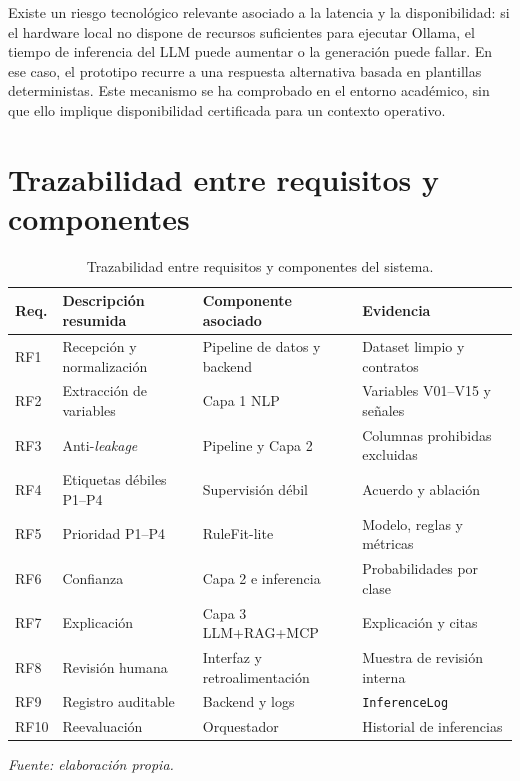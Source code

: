 Existe un riesgo tecnológico relevante asociado a la latencia y la disponibilidad: si el hardware local no dispone de recursos suficientes para ejecutar Ollama, el tiempo de inferencia del LLM puede aumentar o la generación puede fallar. En ese caso, el prototipo recurre a una respuesta alternativa basada en plantillas deterministas. Este mecanismo se ha comprobado en el entorno académico, sin que ello implique disponibilidad certificada para un contexto operativo.

\section{Trazabilidad entre requisitos y componentes}

\begin{table}[htbp]
\centering
\scriptsize
\setlength{\tabcolsep}{4pt}
\begin{tabularx}{\textwidth}{|p{1.1cm}|X|X|X|}
\hline
\textbf{Req.} & \textbf{Descripción resumida} & \textbf{Componente asociado} & \textbf{Evidencia} \\ \hline
RF1 & Recepción y normalización & Pipeline de datos y backend & Dataset limpio y contratos \\ \hline
RF2 & Extracción de variables & Capa 1 NLP & Variables V01--V15 y señales \\ \hline
RF3 & Anti-\textit{leakage} & Pipeline y Capa 2 & Columnas prohibidas excluidas \\ \hline
RF4 & Etiquetas débiles P1--P4 & Supervisión débil & Acuerdo y ablación \\ \hline
RF5 & Prioridad P1--P4 & RuleFit-lite & Modelo, reglas y métricas \\ \hline
RF6 & Confianza & Capa 2 e inferencia & Probabilidades por clase \\ \hline
RF7 & Explicación & Capa 3 LLM+RAG+MCP & Explicación y citas \\ \hline
RF8 & Revisión humana & Interfaz y retroalimentación & Muestra de revisión interna \\ \hline
RF9 & Registro auditable & Backend y logs & \texttt{InferenceLog} \\ \hline
RF10 & Reevaluación & Orquestador & Historial de inferencias \\ \hline
\end{tabularx}
\caption{Trazabilidad entre requisitos y componentes del sistema.}
\label{tab:trazabilidad-requisitos-componentes}
\smallskip
{\small\textit{Fuente: elaboración propia.}\par}
\end{table}

